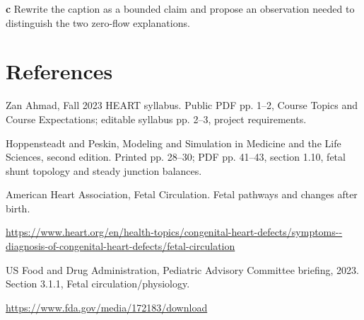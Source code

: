 \documentclass[11pt,letterpaper]{article}
\theoremstyle{definition}\newtheorem{definition}{Definition}\newtheorem{example}{Example}
\numberwithin{equation}{section}
\begin{document}
\textbf{c} Rewrite the caption as a bounded claim and propose an observation needed to distinguish the two zero-flow explanations.

\section*{References}
\noindent\begin{minipage}{\linewidth}
Zan Ahmad, Fall 2023 HEART syllabus. Public PDF pp. 1--2, Course Topics and Course Expectations; editable syllabus pp. 2--3, project requirements.

\end{minipage}\par\medskip
\noindent\begin{minipage}{\linewidth}
Hoppensteadt and Peskin, Modeling and Simulation in Medicine and the Life Sciences, second edition. Printed pp. 28--30; PDF pp. 41--43, section 1.10, fetal shunt topology and steady junction balances.

\end{minipage}\par\medskip
\noindent\begin{minipage}{\linewidth}
American Heart Association, Fetal Circulation. Fetal pathways and changes after birth.

\url{https://www.heart.org/en/health-topics/congenital-heart-defects/symptoms--diagnosis-of-congenital-heart-defects/fetal-circulation}
\end{minipage}\par\medskip
\noindent\begin{minipage}{\linewidth}
US Food and Drug Administration, Pediatric Advisory Committee briefing, 2023. Section 3.1.1, Fetal circulation/physiology.

\url{https://www.fda.gov/media/172183/download}
\end{minipage}\par\medskip
\end{document}
